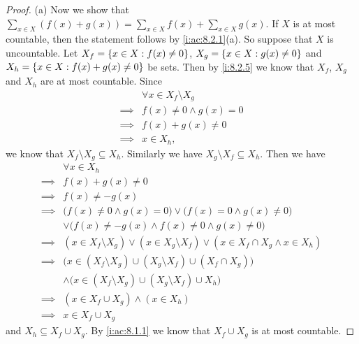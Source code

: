 \begin{proof}{(a)}
  Now we show that \(\sum_{x \in X} (f(x) + g(x)) = \sum_{x \in X} f(x) + \sum_{x \in X} g(x)\).
  If \(X\) is at most countable, then the statement follows by \cref{i:ac:8.2.1}(a).
  So suppose that \(X\) is uncountable.
  Let \(X_f = \left\lbrace x \in X : f(x) \neq 0\right\rbrace\), \(X_g = \left\lbrace x \in X : g(x) \neq 0\right\rbrace\) and \(X_h = \left\lbrace x \in X : f(x) + g(x) \neq 0\right\rbrace\) be sets.
  Then by \cref{i:8.2.5} we know that \(X_f\), \(X_g\) and \(X_h\) are at most countable.
  Since
  \begin{align*}
             & \forall x \in X_f \setminus X_g \\
    \implies & f(x) \neq 0 \land g(x) = 0      \\
    \implies & f(x) + g(x) \neq 0              \\
    \implies & x \in X_h,
  \end{align*}
  we know that \(X_f \setminus X_g \subseteq X_h\).
  Similarly we have \(X_g \setminus X_f \subseteq X_h\).
  Then we have
  \begin{align*}
             & \forall x \in X_h                                                                                  \\
    \implies & f(x) + g(x) \neq 0                                                                                 \\
    \implies & f(x) \neq -g(x)                                                                                    \\
    \implies & \big(f(x) \neq 0 \land g(x) = 0\big) \lor \big(f(x) = 0 \land g(x) \neq 0\big)                     \\
             & \lor \big(f(x) \neq -g(x) \land f(x) \neq 0 \land g(x) \neq 0\big)                                 \\
    \implies & (x \in X_f \setminus X_g) \lor (x \in X_g \setminus X_f) \lor (x \in X_f \cap X_g \land x \in X_h) \\
    \implies & \big(x \in (X_f \setminus X_g) \cup (X_g \setminus X_f) \cup (X_f \cap X_g)\big)                   \\
             & \land \big(x \in (X_f \setminus X_g) \cup (X_g \setminus X_f) \cup X_h\big)                        \\
    \implies & (x \in X_f \cup X_g) \land (x \in X_h)                                                             \\
    \implies & x \in X_f \cup X_g
  \end{align*}
  and \(X_h \subseteq X_f \cup X_g\).
  By \cref{i:ac:8.1.1} we know that \(X_f \cup X_g\) is at most countable.

\end{proof}
